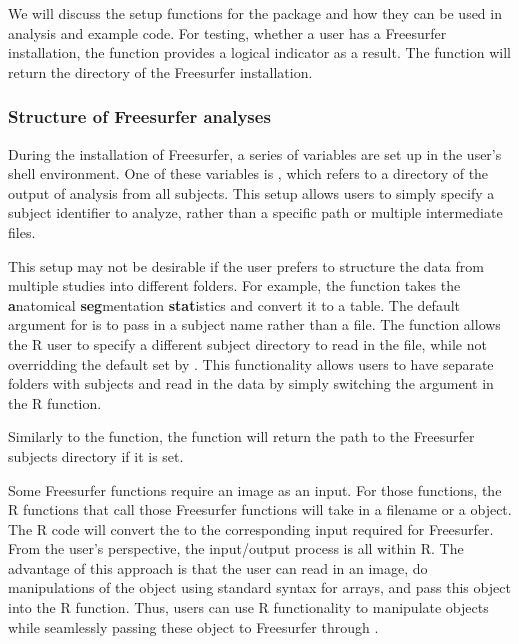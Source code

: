 We will discuss the setup functions for the  package and
how they can be used in analysis and example code. For testing, whether
a user has a Freesurfer installation, the  function
provides a logical indicator as a result. The  function
will return the directory of the Freesurfer installation.

\subsubsection{Structure of Freesurfer
analyses}\label{structure-of-freesurfer-analyses}

During the installation of Freesurfer, a series of variables are set up
in the user's shell environment. One of these variables is
, which refers to a directory of the output of
analysis from all subjects. This setup allows users to simply specify a
subject identifier to analyze, rather than a specific path or multiple
intermediate files.

This setup may not be desirable if the user prefers to structure the
data from multiple studies into different folders. For example, the
 function takes the \textbf{a}natomical
\textbf{seg}mentation \textbf{stat}istics and convert it to a table. The
default argument for  is to pass in a subject name
rather than a file. The   function
allows the R user to specify a different subject directory to read in
the file, while not overridding the default set by .
This functionality allows users to have separate folders with subjects
and read in the data by simply switching the  argument
in the R function.

Similarly to the  function, the 
function will return the path to the Freesurfer subjects directory if it
is set.

Some Freesurfer functions require an image as an input. For those
functions, the R  functions that call those Freesurfer
functions will take in a filename or a  object. The R code
will convert the  to the corresponding input required for
Freesurfer. From the user's perspective, the input/output process is all
within R. The advantage of this approach is that the user can read in an
image, do manipulations of the  object using standard syntax
for arrays, and pass this object into the  R function.
Thus, users can use R functionality to manipulate objects while
seamlessly passing these object to Freesurfer through .

